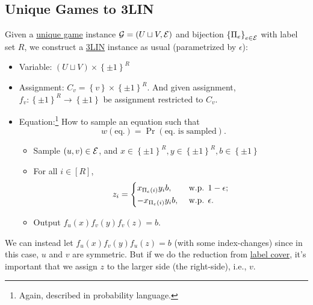 \subsection{Unique Games to 3LIN}
Given a \hyperref[prb:unique-game]{unique game} instance \(\mathcal{\MakeUppercase{g}} =(U \sqcup V, \mathcal{\MakeUppercase{e}} )\) and bijection \(\left\{ \Pi _e \right\}_{e\in \mathcal{\MakeUppercase{e}} } \) with label set \(R\), we construct a \hyperref[prb:max-3LIN]{3LIN} instance as usual (parametrized by \(\epsilon \)):
\begin{itemize}
	\item Variable: \((U \sqcup V) \times \left\{ \pm 1 \right\} ^R\)
	\item Assignment: \(C_v = \left\{ v \right\} \times \left\{ \pm 1 \right\} ^R\). And given assignment, \(f_v \colon \left\{ \pm 1 \right\} ^R \to \left\{ \pm 1 \right\} \) be assignment restricted to \(C_v\).
	\item Equation:\footnote{Again, described in probability language.} How to sample an equation such that
	      \[
		      w(\text{eq.}) = \Pr_{}(\text{eq. is sampled} ).
	      \]
	      \begin{itemize}
		      \item Sample \((u, v)\in \mathcal{\MakeUppercase{e}} \), and \(x\in \left\{ \pm 1 \right\} ^R, y\in \left\{ \pm 1 \right\} ^R, b\in \left\{ \pm 1 \right\} \)
		      \item For all \(i\in [R]\),
		            \[
			            z_i = \begin{dcases}
				            x_{\Pi_e (i)} y_i b,  & \text{ w.p. } 1-\epsilon  ; \\
				            -x_{\Pi_e (i)} y_i b, & \text{ w.p. } \epsilon  .
			            \end{dcases}
		            \]
		      \item Output \(f_u(x) f_v(y) f_v(z) = b\).
	      \end{itemize}
\end{itemize}

\begin{remark}
	We can instead let \(f_u(x) f_v(y) f_u(z) = b\) (with some index-changes) since in this case, \(u\) and \(v\) are symmetric. But if we do the reduction from \hyperref[prb:label-cover]{label cover}, it's important that we assign \(z\) to the larger side (the right-side), i.e., \(v\).
\end{remark}

